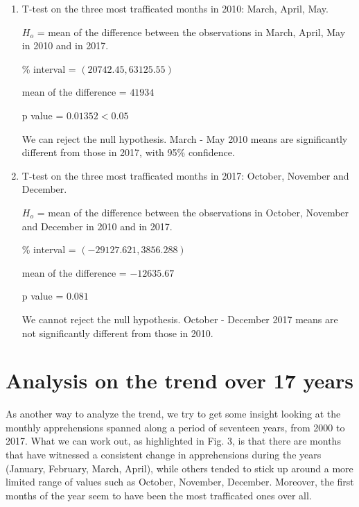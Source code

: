 \documentclass[journal, a4paper]{IEEEtran}
\begin{document}
\begin{enumerate}

\item  T-test on the three most trafficated months in 2010: March, April, May.

\subitem $ H_{o} $ = mean of the difference between the observations in March, April, May in 2010  and in 2017.

\% interval = $ (20742.45, 63125.55) $

\subitem mean of the difference = $  41934  $

\subitem p value = $ 0.01352 < 0.05$


We can reject the null hypothesis. March - May 2010 means are significantly different from those in 2017, with 95\% confidence. 

\item  T-test on the three most trafficated months in 2017:  October, November and December.

\subitem $ H_{o} $ = mean of the difference between the observations in October, November and December in 2010  and in 2017.

\% interval = $ (-29127.621,  3856.288) $

\subitem mean of the difference = $ -12635.67  $

\subitem p value = $ 0.081 $


We cannot reject the null hypothesis. October - December 2017 means are not significantly different from those in 2010. 

\end{enumerate}






	\section{Analysis on the trend over 17 years}


As another way to analyze the trend, we try to get some insight looking at the monthly apprehensions spanned along a period of seventeen years, from 2000 to 2017. 
What we can work out, as highlighted in Fig. 3, is that there are months that have witnessed a consistent change in apprehensions during the years (January, February, March, April), while others tended to stick up around a more limited range of values such as October, November, December. Moreover, the first months of the year seem to have been the most trafficated ones over all. 
\end{document}
